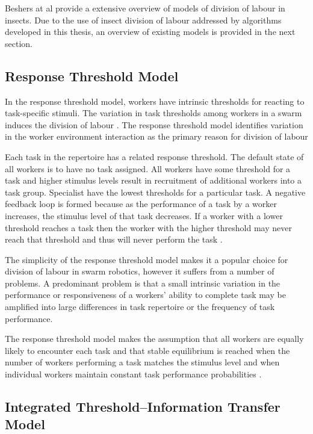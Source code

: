 Beshers at al \cite{beshers2001models} provide a extensive overview of models of division of labour in insects. Due to the use of insect division of labour addressed by algorithms developed in this thesis, an overview of existing models is provided in the next section.

\subsection{Response Threshold Model}

In the response threshold model, workers have intrinsic thresholds for reacting to task-specific stimuli. The variation in task thresholds among workers in a swarm induces the division of labour \cite{robinson1992regulation}. The response threshold model identifies variation in the worker environment interaction as the primary reason for division of labour

Each task in the repertoire has a related response threshold. The default state of all workers is to have no task assigned. All workers have some threshold for a task and higher stimulus levels result in recruitment of additional workers into a task group. Specialist have the lowest thresholds for a particular task. A negative feedback loop is formed because as the performance of a task by a worker increases, the stimulus level of that task decreases. If a worker with a lower threshold reaches a task then the worker with the higher threshold may never reach that threshold and thus will never perform the task \cite{beshers2001models}.

The simplicity of the response threshold model makes it a popular choice for division of labour in swarm robotics, however it suffers from a number of problems. A predominant problem is that a small intrinsic variation in the performance or responsiveness of a workers' ability to complete task may be amplified into large differences in task repertoire or the frequency of task performance. 

The response threshold model makes the assumption that all workers are equally likely to encounter each task and that stable equilibrium is reached when the number of workers performing a task matches the stimulus level and when individual workers maintain constant task performance probabilities \cite{page1990self}.

\subsection{Integrated Threshold--Information Transfer Model}
\label{integratedthreshold}

